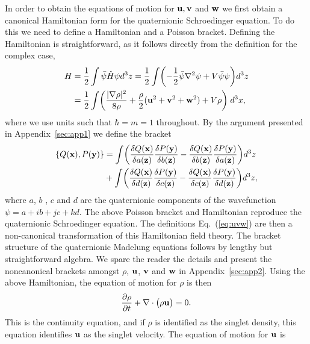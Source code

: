 \documentclass[a4paper,aps,prd,preprint,groupedaddress]{revtex4}
\newcommand{\bfu}{{\bf u}}
\newcommand{\bfv}{{\bf v}}
\newcommand{\bfw}{{\bf w}}
\begin{document}
In order to obtain the equations of motion for $\bfu, \bfv$ and $\bfw$ we first obtain a canonical Hamiltonian form for the quaternionic Schroedinger equation. To do this we need to define a Hamiltonian and a Poisson bracket. Defining the Hamiltonian is straightforward, as it follows directly from the definition for the complex case,
\begin{equation}
\begin{split}
H &= \frac{1}{2}\int \bar\psi\hat H\psi d^3 z=\frac{1}{2}\int\biggl(-\frac{1}{2}\bar\psi\nabla^2\psi + V\bar\psi\psi\biggr)  d^3z\\
&= \frac{1}{2}\int \biggl( \frac{|\nabla\rho|^2}{8\rho}+\frac{\rho}{2}(\bfu^2 +\bfv^2 +\bfw^2)+ V\rho\biggr)\; d^3x,
\end{split}
\end{equation}
where we use units such that $\hbar = m = 1$ throughout. By the argument presented in Appendix~\ref{sec:app1} we define the bracket 
\begin{equation}
\label{eq:bracket}
\begin{split}
\{Q({\bf x}),P({\bf y})\} &=\int\biggl(\frac{\delta Q({\bf x})}{\delta a({\bf z})}\frac{\delta P({\bf y})}{\delta b({\bf z})}-\frac{\delta Q({\bf x})}{\delta b({\bf z})}\frac{\delta P({\bf y})}{\delta a({\bf z})}\biggr)d^3z\\
&+\int\biggl(\frac{\delta Q({\bf x})}{\delta d({\bf z})}\frac{\delta P({\bf y})}{\delta c({\bf z})}-\frac{\delta Q({\bf x})}{\delta c({\bf z})}\frac{\delta P({\bf y})}{\delta d({\bf z})}\biggr)d^3z,
\end{split}
\end{equation}
where $a$, $b$ , $c$ and $d$ are the quaternionic components of the wavefunction $\psi =a + ib + jc + kd$.  The above Poisson bracket and Hamiltonian reproduce the quaternionic Schroedinger equation. The definitions Eq.~(\ref{eq:uvw}) are then a non-canonical transformation of this Hamiltonian field theory. The bracket structure of the quaternionic Madelung equations follows by lengthy but straightforward algebra. We spare the reader the details and present the noncanonical brackets amongst $\rho$, $\bfu$, $\bfv$ and $\bfw$ in Appendix~\ref{sec:app2}.  Using the above Hamiltonian, the equation of motion for $\rho$ is then
\begin{equation}
\frac{\partial \rho}{\partial t} + \nabla\cdot\bigl(\rho \bfu\bigr) = 0.
\end{equation}
This is the continuity equation, and if $\rho$ is identified as the singlet density, this equation identifies $\bfu$ as the singlet velocity. The equation of motion for $\bfu$ is
\end{document}
